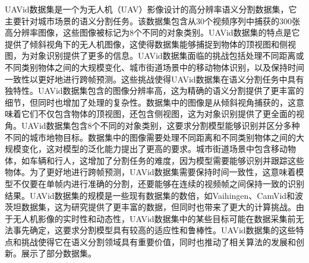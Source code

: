 UAVid数据集是一个为无人机（UAV）影像设计的高分辨率语义分割数据集，它主要针对城市场景的语义分割任务。该数据集包含从30个视频序列中捕获的300张高分辨率图像，这些图像被标记为8个不同的对象类别。UAVid数据集的特点是它提供了倾斜视角下的无人机图像，这使得数据集能够捕捉到物体的顶视图和侧视图，为对象识别提供了更多的信息。UAVid数据集面临的挑战包括处理不同距离或不同类别物体之间的大规模变化、城市街道场景中的移动物体识别，以及保持时间一致性以更好地进行跨帧预测。这些挑战使得UAVid数据集在语义分割任务中具有独特性。UAVid数据集包含的图像分辨率高，这为精确的语义分割提供了更丰富的细节，但同时也增加了处理的复杂性。数据集中的图像是从倾斜视角捕获的，这意味着它们不仅包含物体的顶视图，还包含侧视图，这为对象识别提供了更全面的视角。UAVid数据集包含8个不同的对象类别，这要求分割模型能够识别并区分多种不同的城市地物目标。数据集中的图像需要处理不同距离和不同类别物体之间的大规模变化，这对模型的泛化能力提出了更高的要求。城市街道场景中包含移动物体，如车辆和行人，这增加了分割任务的难度，因为模型需要能够识别并跟踪这些物体。为了更好地进行跨帧预测，UAVid数据集需要保持时间一致性，这意味着模型不仅要在单帧内进行准确的分割，还要能够在连续的视频帧之间保持一致的识别结果。UAVid数据集的规模是一些现有数据集的数倍，如Vaihingen、CamVid和波茨坦数据集，这为研究提供了更丰富的数据，但同时也带来了更大的计算挑战。由于无人机影像的实时性和动态性，UAVid数据集中的某些目标可能在数据采集前无法事先确定，这要求分割模型具有较高的适应性和鲁棒性。UAVid数据集的这些特点和挑战使得它在语义分割领域具有重要价值，同时也推动了相关算法的发展和创新。展示了部分数据集。


